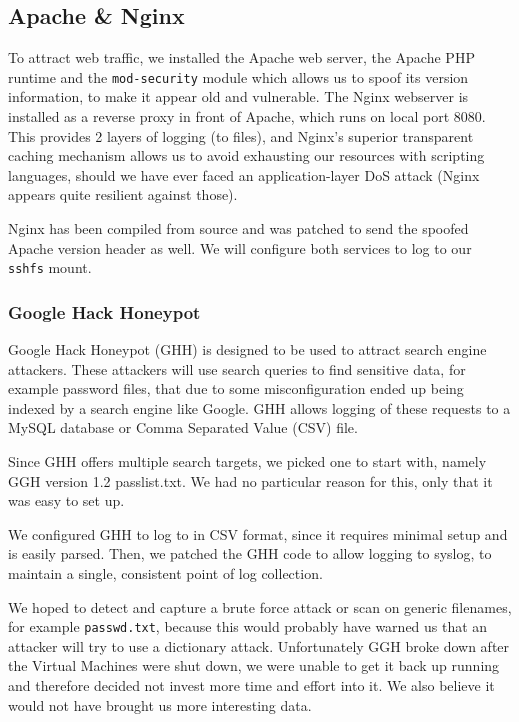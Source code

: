 \documentclass[11pt]{article}
\begin{document}

\subsection{Apache \& Nginx}
To attract web traffic, we installed the Apache web server, the Apache PHP runtime and the \verb|mod-security| module which allows us to spoof its version information, to make it appear old and vulnerable.
The Nginx webserver is installed as a reverse proxy in front of Apache, which runs on local port 8080.
This provides 2 layers of logging (to files), and Nginx's superior transparent caching mechanism allows us to avoid exhausting our resources with scripting languages, should we have ever faced an application-layer DoS attack (Nginx appears quite resilient against those).

Nginx has been compiled from source and was patched to send the spoofed Apache version header as well.
We will configure both services to log to our \verb|sshfs| mount.

\subsubsection{Google Hack Honeypot}
Google Hack Honeypot (GHH) is designed to be used to attract search engine attackers. 
These attackers will use search queries to find sensitive data, for example password files, that due to some misconfiguration ended up being indexed by a search engine like Google.
GHH allows logging of these requests to a MySQL database or Comma Separated Value (CSV) file.

Since GHH offers multiple search targets, we picked one to start with, namely GGH version 1.2 passlist.txt.
We had no particular reason for this, only that it was easy to set up. 

We configured GHH to log to in CSV format, since it requires minimal setup and is easily parsed.
Then, we patched the GHH code to allow logging to syslog, to maintain a single, consistent point of log collection.

We hoped to detect and capture a brute force attack or scan on generic filenames, for example \verb|passwd.txt|, because this would probably have warned us that an attacker will try to use a dictionary attack.
Unfortunately GGH broke down after the Virtual Machines were shut down, we were unable to get it back up running and therefore decided not invest more time and effort into it. We also believe it would not have brought us more interesting data.
\end{document}
